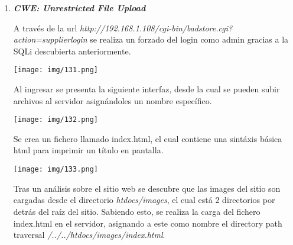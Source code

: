 \documentclass[12pt,oneside,a4paper]{book}
\begin{document}
\begin{enumerate}
\vspace{2em}

\item 	\textbf{\textit{CWE: Unrestricted File Upload}}

\vspace{1em}

\hspace{20pt}
A través de la url \textit{http://192.168.1.108/cgi-bin/badstore.cgi?action=supplierlogin} se realiza un forzado del login como admin gracias a la SQLi descubierta anteriormente.

\vspace{1em}

\begin{center}
    \texttt{[image: img/131.png]}
\end{center}

\vspace{1em}

\hspace{20pt}
Al ingresar se presenta la siguiente interfaz, desde la cual se pueden subir archivos al servidor asignándoles un nombre específico.

\vspace{1em}

\begin{center}
    \texttt{[image: img/132.png]}
\end{center}

\vspace{1em}

\hspace{20pt}
Se crea un fichero llamado index.html, el cual contiene una sintáxis básica html para imprimir un título en pantalla.

\vspace{1em}

\begin{center}
    \texttt{[image: img/133.png]}
\end{center}

\vspace{1em}

\hspace{20pt}
Tras un análisis sobre el sitio web se descubre que las images del sitio son cargadas desde el directorio \textit{htdocs/images}, el cual está 2 directorios por detrás del raíz del sitio. Sabiendo esto, se realiza la carga del fichero index.html en el servidor, asignando a este como nombre el directory path traversal \textit{/../../htdocs/images/index.html}.


\end{enumerate}
\end{document}
